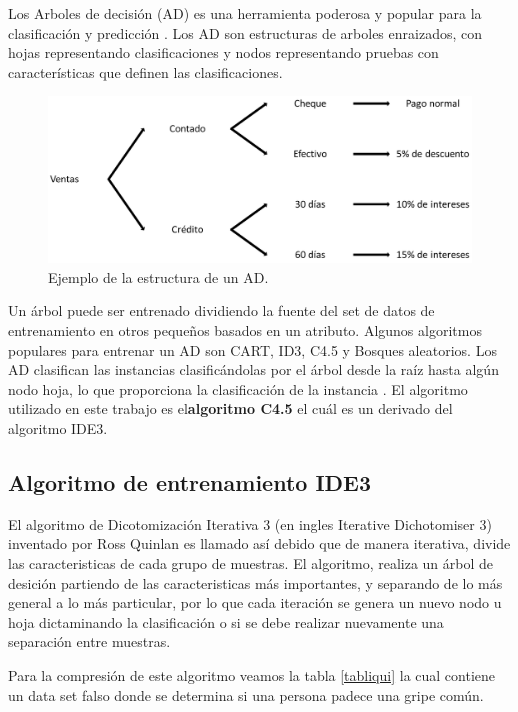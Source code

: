 \documentclass[twoside,spanish,ESP,MSc]{plantillaLabUPV}
\theoremstyle{definition}
\begin{document}
Los Arboles de decisión (AD) es una herramienta poderosa y popular para la clasificación y predicción \cite{cart84}. Los AD son estructuras de arboles enraizados, con hojas representando clasificaciones y nodos representando pruebas con características que definen las clasificaciones.

\begin{figure}[h] 
	\centering 
		\includegraphics[scale=.30]{ima/add} 
	\caption{Ejemplo de la estructura de un AD.} 
	\label{add} 
\end{figure}


Un árbol puede ser entrenado dividiendo la fuente del set de datos de entrenamiento en otros pequeños basados en un atributo. Algunos algoritmos populares para entrenar un AD son CART, ID3, C4.5 y Bosques aleatorios.  Los AD clasifican las instancias clasificándolas por el árbol desde la raíz hasta algún nodo hoja, lo que proporciona la clasificación de la instancia \cite{Mitchell:1997:ML:541177}. El algoritmo utilizado en este trabajo es el\textbf{algoritmo C4.5} el cuál es un derivado del algoritmo IDE3.

\subsection{Algoritmo de entrenamiento IDE3}

El algoritmo de Dicotomización Iterativa 3 (en ingles Iterative Dichotomiser 3) inventado por Ross Quinlan es llamado así debido que de manera iterativa, divide las caracteristicas de cada grupo de muestras. El algoritmo, realiza un árbol de desición partiendo de las caracteristicas más importantes, y separando de lo más general a lo más particular, por lo que cada iteración se genera un nuevo nodo u hoja dictaminando la clasificación o si se debe realizar nuevamente una separación entre muestras.

Para la compresión de este algoritmo veamos la tabla \ref{tabliqui}
la cual contiene un data set falso donde se determina si una persona padece una gripe común. 
\end{document}

